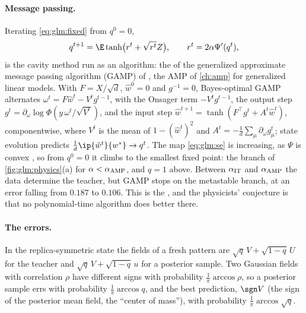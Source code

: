 \begin{refsection}
\paragraph{Message passing.} Iterating \eqref{eq:glm:fixed} from $q^0=0$,
\begin{equation}\label{eq:glm:se}
q^{t+1}=\E\tanh\bigl(r^t+\sqrt{r^t}Z\bigr),\qquad r^t=2\alpha\Psi'(q^t),
\end{equation}
is the cavity method run as an algorithm: the  of the generalized approximate message passing algorithm (GAMP) of \textcite{Rangan2011}, the AMP of \cref{ch:amp} for generalized linear models. With $F=X/\sqrt d$, $\hat w^0=0$ and $g^{-1}=0$, Bayes-optimal GAMP alternates $\omega^t=F\hat w^t-V^tg^{t-1}$, with the Onsager term $-V^tg^{t-1}$, the output step $g^t=\partial_\omega\log\Phi(y\,\omega^t/\sqrt{V^t})$, and the input step $\hat w^{t+1}=\tanh(F^\top g^t+A^t\hat w^t)$, componentwise, where $V^t$ is the mean of $1-(\hat w^t)^2$ and $A^t=-\frac1d\sum_\mu\partial_\omega g^t_\mu$; state evolution predicts $\frac1d\ip{\hat w^t}{w^*}\to q^t$. The map \eqref{eq:glm:se} is increasing, as $\Psi$ is convex \parencite{BarbierEtAl2019}, so from $q^0=0$ it climbs to the smallest fixed point: the branch of \cref{fig:glm:physics}(a) for $\alpha<\alpha_{\mathrm{AMP}}$, and $q=1$ above. Between $\alpha_{\mathrm{IT}}$ and $\alpha_{\mathrm{AMP}}$ the data determine the teacher, but GAMP stops on the metastable branch, at an error falling from $0.187$ to $0.106$. This is the , and the physicists' conjecture \parencite{BarbierEtAl2019} is that no polynomial-time algorithm does better there.

\paragraph{The errors.} In the replica-symmetric state the fields of a fresh pattern are $\sqrt q\,V+\sqrt{1-q}\,U$ for the teacher and $\sqrt q\,V+\sqrt{1-q}\,u$ for a posterior sample. Two Gaussian fields with correlation $\rho$ have different signs with probability $\frac1\pi\arccos\rho$, so a posterior sample errs with probability $\frac1\pi\arccos q$, and the best prediction, $\sgn V$ (the sign of the posterior mean field, the ``center of mass''), with probability $\frac1\pi\arccos\sqrt q$.


\end{refsection}
